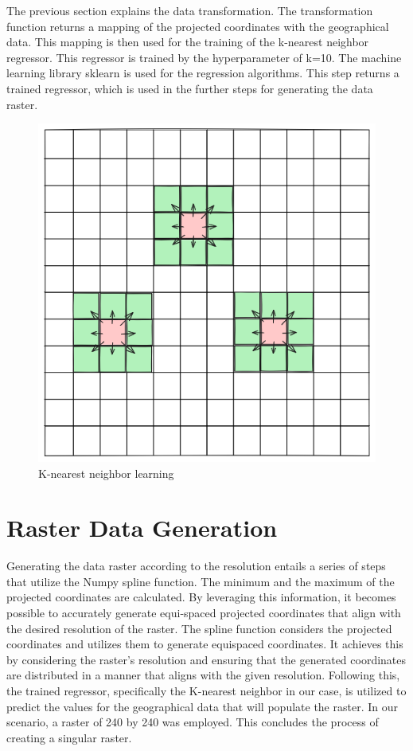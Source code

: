 The previous section explains the data transformation. The transformation function returns a mapping of the projected coordinates with the geographical data. This mapping is then used for the training of the k-nearest neighbor regressor. This regressor is trained by the hyperparameter of k=10. The machine learning library sklearn is used for the regression algorithms. This step returns a trained regressor, which is used in the further steps for generating the data raster.
\begin{figure}[h]
    \centering
    \includegraphics[width=0.5\linewidth]{figures/chapter-7/raster_interpolation.png}
    \caption{K-nearest neighbor learning}
    \label{fig:knn-learning}
\end{figure}

\section{Raster Data Generation}

Generating the data raster according to the resolution entails a series of steps that utilize the Numpy spline function. The minimum and the maximum of the projected coordinates are calculated. By leveraging this information, it becomes possible to accurately generate equi-spaced projected coordinates that align with the desired resolution of the raster.
The spline function considers the projected coordinates and utilizes them to generate equispaced coordinates. It achieves this by considering the raster's resolution and ensuring that the generated coordinates are distributed in a manner that aligns with the given resolution.
Following this, the trained regressor, specifically the K-nearest neighbor in our case, is utilized to predict the values for the geographical data that will populate the raster. In our scenario, a raster of 240 by 240 was employed. This concludes the process of creating a singular raster.

